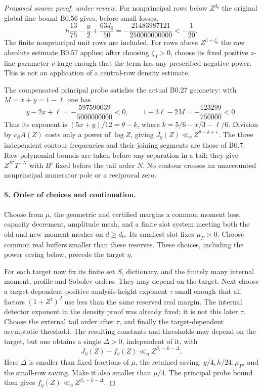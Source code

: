 \begin{proof}[Proposed source proof, under review]
For nonprincipal rows below $Z^{d_0}$ the original global-line bound
B0.56 gives, before small losses,
\[
 h\frac{13}{75}-\frac y2+\frac{63d_0}{50}
 =-\frac{21483987121}{250000000000}<-\frac1{20}.
\]
The finite nonprincipal unit rows are included. For rows above
$Z^{h+\zeta_0}$ the raw absolute estimate B0.57 applies: after choosing
$\zeta_0>0$, choose its fixed positive $z$-line parameter $v$ large
enough that the term has any prescribed negative power. This is not
an application of a central-row density estimate.

The compensated principal probe satisfies the actual B0.27 geometry:
with $M=x+y=1-\ell$ one has
\[
 y-2x+\ell=-\frac{597590039}{5000000000}<0,\qquad
 1+3\ell-2M=-\frac{123299}{750000}<0.
\]
Thus its exponent is $(5x+y)/12=\theta-k$, where
$k=5/6-x/3-\ell/6$. Division by $c_SA(Z)$ costs only a power of
$\log Z$, giving $J_\eta(Z)\ll_\eta Z^{\theta-k+\varepsilon}$.
The three independent contour frequencies and their
joining segments are those of B0.7. Raw polynomial bounds are taken
before any separation in a tail; they give $Z^{B'}T^{-N}$ with $B'$
fixed before the tail order $N$. No contour crosses an unaccounted
nonprincipal numerator pole or a reciprocal zero.

\paragraph{5. Order of choices and continuation.}
Choose from $\mu$, the geometric and certified margins a common moment
loss, capacity decrement, amplitude mesh, and a finite slot system
meeting both the old and new moment meshes on $d\ge d_0$. Its smallest
slot fixes $\mu_P>0$. Choose common real buffers smaller than these
reserves. These choices, including the power saving below, precede
the target $\eta$.

For each target now fix its finite set $S$, dictionary, and the finitely
many internal moment, profile and Sobolev orders. They may depend on the
target. Next choose a target-dependent positive analysis-height exponent
$\tau$ small enough that all factors $(1+Z^\tau)^J$ use less than the
same reserved real margin. The internal detector exponent in the density
proof was already fixed; it is not this later $\tau$. Choose the external
tail order after $\tau$, and finally the target-dependent asymptotic
threshold. The resulting constants and thresholds may depend on the
target, but one obtains a single $\Delta>0$, independent of it, with
\[
 J_\eta(Z)-f_\eta(Z)
       \ll_\eta Z^{\beta_*-k-\Delta}.                \tag{EA.6}
\]
Here $\Delta$ is smaller than fixed fractions of $\mu$, the retained
saving, $y/4,h/24,\mu_P$, and the small-row saving. Make it also smaller
than $\mu/4$. The principal probe bound then gives
$f_\eta(Z)\ll_\eta Z^{\beta_*-k-\Delta}$.


\end{proof}
